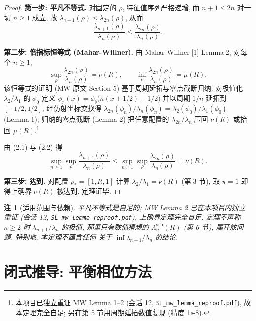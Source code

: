 \documentclass[UTF8]{ctexart}
\newtheorem{remark}[theorem]{注}
\begin{document}
\begin{proof}
\textbf{第一步: 平凡不等式.} 对固定的 $\rho$, 特征值序列严格递增, 而 $n + 1 \leq 2n$
对一切 $n \geq 1$ 成立, 故 $\lambda_{n+1}(\rho) \leq \lambda_{2n}(\rho)$, 从而
\begin{equation}
	\frac{\lambda_{n+1}(\rho)}{\lambda_n(\rho)} \leq \frac{\lambda_{2n}(\rho)}{\lambda_n(\rho)} .
\end{equation}

\textbf{第二步: 倍指标恒等式 (Mahar-Willner).} 由 Mahar-Willner [1] Lemma 2,
对每个 $n \geq 1$,
\begin{equation}
	\sup_{\rho} \frac{\lambda_{2n}(\rho)}{\lambda_n(\rho)} = \nu(R),
	\qquad
	\inf_{\rho} \frac{\lambda_{2n}(\rho)}{\lambda_n(\rho)} = \mu(R).
\end{equation}
该恒等式的证明 (MW 原文 Section 5) 基于周期延拓与零点截断归纳: 对极值化
$\lambda_2/\lambda_1$ 的 $\phi_0$ 定义 $\phi_n(x) = \phi_0\bigl(n(x+1/2)-1/2\bigr)$
并以周期 $1/n$ 延拓到 $[-1/2, 1/2]$, 经仿射坐标变换得
$\lambda_{2n}(\phi_n)/\lambda_n(\phi_n) = \lambda_2(\phi_0)/\lambda_1(\phi_0)$ (Lemma 1);
归纳的零点截断 (Lemma 2) 把任意配置的 $\lambda_{2n}/\lambda_n$ 压回 $\nu(R)$ 或抬回
$\mu(R)$.\footnote{本项目已独立重证 MW Lemma 1--2 (会话 12, \texttt{SL\_mw\_lemma\_reproof.pdf}), 故本定理完全自足; 另在第 5 节用周期延拓数值复现 (精度 1e-8).}

由 (2.1) 与 (2.2) 得
\begin{equation}
	\sup_{n \geq 1} \sup_{\rho} \frac{\lambda_{n+1}(\rho)}{\lambda_n(\rho)}
	\leq \sup_{n \geq 1} \sup_{\rho} \frac{\lambda_{2n}(\rho)}{\lambda_n(\rho)}
	= \nu(R).
\end{equation}

\textbf{第三步: 达到.} 对配置 $\rho_* = [1, R, 1]$ 计算 $\lambda_2/\lambda_1 = \nu(R)$
(第 3 节), 取 $n = 1$ 即得上确界 $\nu(R)$ 被达到. 定理证毕.
\end{proof}

\begin{remark}[适用范围与依赖]
平凡不等式是自足的; MW Lemma 2 已在本项目内独立重证 (会话 12,
\texttt{SL\_mw\_lemma\_reproof.pdf}), 上确界定理完全自足.
定理不声称 $n \geq 2$ 时 $\lambda_{n+1}/\lambda_n$ 的极值, 那里只有数值猜想的
$\Lambda_n^{\sup}(R)$ (第 6 节), 属开放问题. 特别地, 本定理不蕴含任何
关于 $\inf \lambda_{n+1}/\lambda_n$ 的结论.
\end{remark}

\section{闭式推导: 平衡相位方法}
\end{document}

